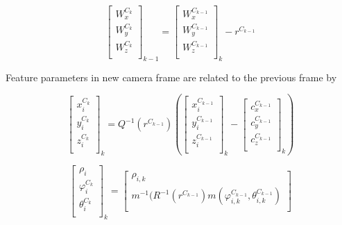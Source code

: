 \begin{equation}
\begin{bmatrix}
W_{x}^{C_{k}} \\
W_{y}^{C_{k}} \\
W_{z}^{C_{k}} \\
\end{bmatrix}_{k-1}= \begin{bmatrix}
W_{x}^{C_{k-1}} \\
W_{y}^{C_{k-1}} \\
W_{z}^{C_{k-1}} \\
\end{bmatrix}_{k}-r^{C_{k-1}}
\end{equation}

Feature parameters in new camera frame are related to the previous frame 
by

\begin{equation}
\begin{bmatrix}
x_{i}^{C_{k}} \\
y_{i}^{C_{k}} \\
z_{i}^{C_{k}} \\
\end{bmatrix}_{k}=Q^{-1}(r^{C_{k-1}})\left(
\begin{bmatrix}
x_{i}^{C_{k-1}} \\
y_{i}^{C_{k-1}} \\
z_{i}^{C_{k-1}} \\
\end{bmatrix}_{k}- \begin{bmatrix}
c_{x}^{C_{k-1}} \\
c_{y}^{C_{k-1}} \\
c_{z}^{C_{k-1}} \\
\end{bmatrix}_{k}\right)
\end{equation}

\begin{equation}
\begin{bmatrix}
\rho_{i} \\
\varphi_{i}^{C_{k}} \\
\theta_{i}^{C_{k}} \\
\end{bmatrix}_{k}=
\begin{bmatrix}
\rho _{i, k} \\
m^{-1}(R^{-1}(r^{C_{k-1}})m(\varphi _{i, k}^{C_{k-1}}, \theta _{i, k}^{C_{k-1}}) \\
\end{bmatrix}
\end{equation}

